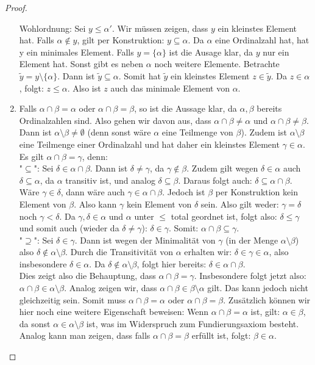 \documentclass[11pt]{scrartcl}
\begin{document}
\begin{proof}
\begin{enumerate}
			Wohlordnung: Sei $y\leq \alpha'$. Wir müssen zeigen, dass $y$ ein kleinstes Element hat. Falls $\alpha\notin y$, gilt per Konstruktion: $ y \subseteq \alpha$. Da $\alpha$ eine Ordinalzahl hat, hat y ein minimales Element. Falls $y= \{ \alpha \}$ ist die Ausage klar, da $y$ nur ein Element hat. Sonst gibt es neben $\alpha$ noch weitere Elemente. Betrachte $\tilde y = y\setminus \{\alpha\}$. Dann ist $\tilde y \subseteq \alpha$. Somit hat $\tilde y$ ein kleinstes Element $z\in \tilde y$. Da $z\in \alpha$, folgt: $z\leq \alpha$. Also ist $z$ auch das minimale Element von $\alpha$.
		\item Falls $\alpha \cap \beta=\alpha$ oder $\alpha \cap \beta =\beta$, so ist die Aussage klar, da $\alpha,\beta$ bereits Ordinalzahlen sind. Also gehen wir davon aus, dass $\alpha \cap \beta \neq \alpha$ und $\alpha \cap \beta \neq \beta$. Dann ist $\alpha \setminus \beta \neq \emptyset$ (denn sonst wäre $\alpha$ eine Teilmenge von $\beta$). Zudem ist $\alpha\setminus\beta$ eine Teilmenge einer Ordinalzahl und hat daher ein kleinstes Element $\gamma\in \alpha$. Es gilt $\alpha \cap \beta = \gamma$, denn: \\
			"$\subseteq$": Sei $\delta\in \alpha \cap \beta$. Dann ist $\delta \neq \gamma$, da $\gamma \notin \beta$. Zudem gilt wegen $\delta\in \alpha$ auch $\delta \subseteq \alpha$, da $\alpha$ transitiv ist, und analog $ \delta \subseteq \beta$. Daraus folgt auch: $ \delta \subseteq \alpha \cap \beta$. Wäre $\gamma\in \delta$, dann wäre auch $\gamma \in \alpha \cap \beta$. Jedoch ist $\beta$ per Konstruktion kein Element von $\beta$. Also kann $\gamma$ kein Element von $\delta$ sein. Also gilt weder: $\gamma = \delta$ noch $\gamma < \delta$. Da $\gamma, \delta \in \alpha$ und $\alpha$ unter $\leq$ total geordnet ist, folgt also: $\delta \leq \gamma$ und somit auch (wieder da $\delta \neq \gamma$): $\delta \in \gamma$. Somit: $\alpha \cap \beta \subseteq \gamma$.\\
			"$\supseteq$": Sei $\delta\in \gamma$. Dann ist wegen der Minimalität von $\gamma$ (in der Menge $\alpha \setminus \beta$) also $\delta\notin \alpha \setminus \beta$. Durch die Transitivität von $\alpha$ erhalten wir: $\delta \in \gamma \in \alpha$, also insbesondere $\delta \in \alpha$. Da $\delta \notin \alpha\setminus \beta$, folgt hier bereits: $\delta\in \alpha \cap \beta$. \\
			Dies zeigt also die Behauptung, dass $\alpha\cap \beta= \gamma$. Insbesondere folgt jetzt also: $\alpha \cap \beta \in \alpha \setminus \beta$. Analog zeigen wir, dass $\alpha \cap \beta \in \beta \setminus \alpha$ gilt. Das kann jedoch nicht gleichzeitig sein. Somit muss $\alpha \cap \beta =\alpha$ oder $\alpha \cap \beta = \beta$. Zusätzlich können wir hier noch eine weitere Eigenschaft beweisen: Wenn $\alpha\cap \beta =\alpha$ ist, gilt: $\alpha \in \beta$, da sonst $\alpha \in \alpha\setminus \beta$ ist, was im Widerspruch zum Fundierungsaxiom besteht. Analog kann man zeigen, dass falls $\alpha \cap \beta = \beta$ erfüllt ist, folgt: $\beta \in \alpha$.

\end{enumerate}
\end{proof}
\end{document}

